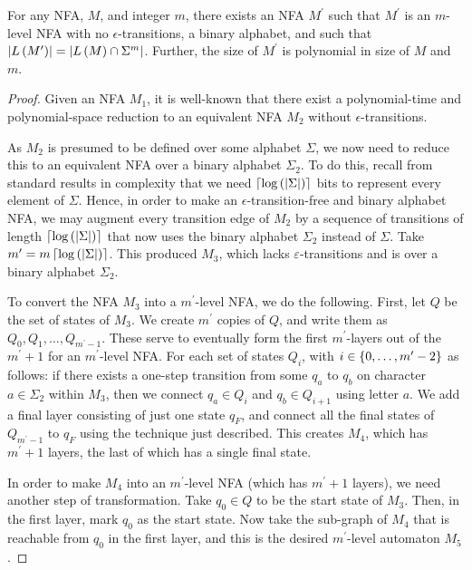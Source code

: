 \documentclass[12pt]{article}
\begin{document}
\begin{lemma}
  For any NFA, \(M\), and integer \(m\),
  there exists an NFA \(M^\prime\) such that \(M^\prime\)
  is an \(m\)-level NFA with no \(\epsilon\)-transitions,
  a binary alphabet, and such that
  \(\left\lvert L\left(M^\prime\right)\right\rvert = \left\lvert L\left(M\right) \cap \Sigma^m\right\rvert\).
  Further, the size of \(M^\prime\) is polynomial in size of \(M\) and \(m\).
\end{lemma}
\begin{proof}
  Given an NFA \(M_1\), it is well-known that there exist
  a polynomial-time and polynomial-space reduction to an equivalent
  NFA \(M_2\) without \(\epsilon\)-transitions.

  As \(M_2\) is presumed to be defined over some alphabet \(\Sigma\),
  we now need to reduce this to an equivalent NFA over a binary alphabet
  \(\Sigma_2\).
  To do this, recall from standard results in complexity that we need
  \(\left\lceil\log\left(\left\lvert\Sigma\right\rvert\right)\right\rceil\) bits to represent every element
  of \(\Sigma\).
  Hence, in order to make an \(\epsilon\)-transition-free and
  binary alphabet NFA,
  we may augment every transition edge of \(M_2\)
  by a sequence of transitions of length
  \(\left\lceil\log\left(\left\lvert\Sigma\right\rvert\right)\right\rceil\) that now uses the binary
  alphabet \(\Sigma_2\) instead of \(\Sigma\).
  Take \(m^\prime = m \left\lceil\log\left(\left\lvert\Sigma\right\rvert\right)\right\rceil\).
  This produced \(M_3\), which lacks \(\varepsilon\)-transitions
  and is over a binary alphabet \(\Sigma_2\).

  To convert the NFA \(M_3\) into a
  \(m^\prime\)-level NFA,
  we do the following.
  First, let \(Q\) be the set of states of \(M_3\).
  We create \(m^\prime\) copies of \(Q\), and write them as
  \(Q_0, Q_1, \ldots, Q_{m^\prime - 1}\).
  These serve to eventually form the first \(m^\prime\)-layers out of the
  \(m^\prime + 1\) for an \(m^\prime\)-level NFA.
  For each set of states \(Q_i\), with
  \(i \in \left\{0, \ldots, m^\prime - 2\right\}\)
  as follows: if there exists a one-step transition from some \(q_a\) to
  \(q_b\) on character \(a \in \Sigma_2\) within \(M_3\),
  then we connect \(q_a \in Q_i\) and \(q_b \in Q_{i + 1}\) using
  letter \(a\).
  We add a final layer consisting of just one state \(q_F\),
  and connect all the final states of \(Q_{m^\prime - 1}\) to
  \(q_F\) using the technique just described.
  This creates \(M_4\), which has \(m^\prime + 1\) layers,
  the last of which has a single final state.

  In order to make \(M_4\) into an \(m^\prime\)-level NFA
  (which has \(m^\prime + 1\) layers),
  we need another step of transformation.
  Take \(q_0 \in Q\) to be the start state of \(M_3\).
  Then, in the first layer, mark \(q_0\) as the start state.
  Now take the sub-graph of \(M_4\) that is reachable from \(q_0\)
  in the first layer,
  and this is the desired \(m^\prime\)-level automaton \(M_5\).


\end{proof}
\end{document}
